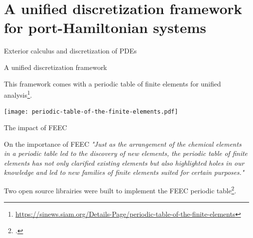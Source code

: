 \documentclass[aspectratio=169]{beamer}
\begin{document}
\section{A unified discretization framework for port-Hamiltonian systems}


\begin{frame}{Exterior calculus and discretization of PDEs}
	
\begin{block}{A unified discretization framework}
\end{block}

This framework comes with a periodic table of finite elements for unified analysis\footnote{\url{https://sinews.siam.org/Details-Page/periodic-table-of-the-finite-elements}}.

\centering
\texttt{[image: periodic-table-of-the-finite-elements.pdf]}
\end{frame}

\begin{frame}{The impact of FEEC}
		\begin{block}{On the importance of FEEC}
			\textit{"Just as the arrangement of the chemical elements in a periodic table led to the discovery of new elements, the periodic table of finite elements has not only clarified existing elements but also highlighted holes in our knowledge and led to new families of finite elements suited for certain purposes."}
		\end{block}
		Two open source librairies were built to implement the FEEC periodic table\footcite{logg2012,rathgeber2017firedrake}.

\end{frame}
\end{document}
